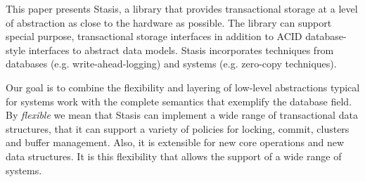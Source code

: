 \documentclass[letterpaper,twocolumn,10pt]{article}
\newcommand{\yad}{Stasis\xspace}
\newcommand{\eat}[1]{}
\begin{document}
\eat{
Examples of real world systems that currently fall into this category
are web search engines, document repositories, large-scale web-email
services, map and trip planning services, ticket reservation systems,
photo and video repositories, bioinformatics, version control systems,
work-flow applications, CAD/VLSI applications and directory services.

In short, we believe that a fundamental architectural shift in
transactional storage is necessary before general purpose storage
systems are of practical use to modern applications.
Until this change occurs, databases' imposition of unwanted
abstraction upon their users will restrict system designs and
implementations.
}

%


This paper presents \yad, a library that provides transactional
storage at a level of abstraction as close to the hardware as
possible.  The library can support special purpose, transactional
storage interfaces in addition to ACID database-style interfaces to
abstract data models.  \yad incorporates techniques from databases
(e.g. write-ahead-logging) and systems (e.g. zero-copy techniques).


Our goal is to combine the flexibility and layering of low-level
abstractions typical for systems work with the complete semantics
that exemplify the database field.
By {\em flexible} we mean that \yad{}  can implement a wide
range of transactional data structures, that it can support a variety
of policies for locking, commit, clusters and buffer management.
Also, it is extensible for new core operations
and new data structures. It is this flexibility that allows the
support of a wide range of systems.
\end{document}
